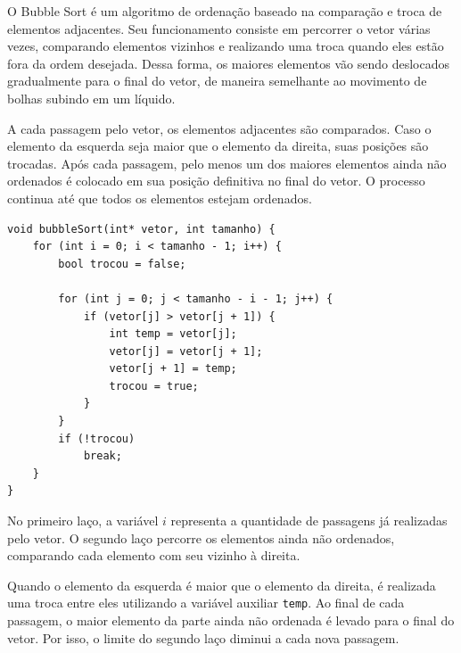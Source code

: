 \quad O Bubble Sort é um algoritmo de ordenação baseado na comparação
e troca de elementos adjacentes. Seu funcionamento consiste em percorrer
o vetor várias vezes, comparando elementos vizinhos e realizando uma troca
quando eles estão fora da ordem desejada. Dessa forma, os maiores elementos
vão sendo deslocados gradualmente para o final do vetor, de maneira
semelhante ao movimento de bolhas subindo em um líquido.

\quad A cada passagem pelo vetor, os elementos adjacentes são comparados.
Caso o elemento da esquerda seja maior que o elemento da direita, suas
posições são trocadas. Após cada passagem, pelo menos um dos maiores
elementos ainda não ordenados é colocado em sua posição definitiva no final
do vetor. O processo continua até que todos os elementos estejam
ordenados.

\begin{lstlisting}[caption={Implementação do Bubble Sort}]
void bubbleSort(int* vetor, int tamanho) {
    for (int i = 0; i < tamanho - 1; i++) {
        bool trocou = false;

        for (int j = 0; j < tamanho - i - 1; j++) {
            if (vetor[j] > vetor[j + 1]) {
                int temp = vetor[j];
                vetor[j] = vetor[j + 1];
                vetor[j + 1] = temp;
                trocou = true;
            }
        }
        if (!trocou)
            break;
    }
}
\end{lstlisting}

\quad No primeiro laço, a variável $i$ representa a quantidade de
passagens já realizadas pelo vetor. O segundo laço percorre os elementos
ainda não ordenados, comparando cada elemento com seu vizinho à direita.

\quad Quando o elemento da esquerda é maior que o elemento da direita,
é realizada uma troca entre eles utilizando a variável auxiliar
\texttt{temp}. Ao final de cada passagem, o maior elemento da parte ainda
não ordenada é levado para o final do vetor. Por isso, o limite do segundo
laço diminui a cada nova passagem.
